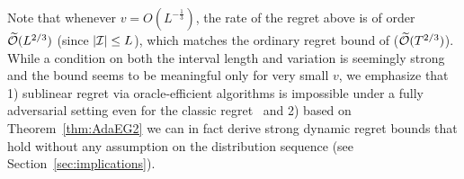Note that whenever $v =O(L^{-\frac{1}{3}})$, the rate of the regret above is of order $\widetilde{\mathcal{O}}(L^{2/3})$ (since $|{\mathcal{I}}| \leq L$), 
which matches the ordinary regret bound of \EG ($\widetilde{\mathcal{O}}(T^{2/3})$). 
While a condition on both the interval length and variation is seemingly strong
and the bound seems to be meaningful only for very small $v$,
we emphasize that 1) sublinear regret via oracle-efficient algorithms is impossible under a fully adversarial setting 
even for the classic regret~\citep{Hazan2016} and 2) based on Theorem~\ref{thm:AdaEG2} we can in fact derive strong dynamic regret bounds that hold without 
any assumption on the distribution sequence (see Section~\ref{sec:implications}).




